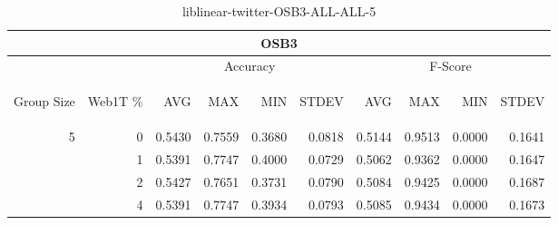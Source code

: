 \begin{center}
\begin{table}[htbp]
\begin{tabular}{ | r | r | r | r | r | r | r | r | r | r |}
\hline
\multicolumn{10}{|c|}{OSB3}\\
\hline
 & & \multicolumn{4}{|c|}{Accuracy} & \multicolumn{4}{|c|}{F-Score}\\ \cline{3-10}
\begin{sideways}Group Size\end{sideways} & \begin{sideways}Web1T \%\end{sideways} & \begin{sideways}AVG\end{sideways} & \begin{sideways}MAX\end{sideways} & \begin{sideways}MIN\end{sideways} & \begin{sideways}STDEV\end{sideways} & \begin{sideways}AVG\end{sideways} & \begin{sideways}MAX\end{sideways} & \begin{sideways}MIN\end{sideways} & \begin{sideways}STDEV\end{sideways}\\
\hline
\multirow{3}{*}{5}
 & 0 & 0.5430 & 0.7559 & 0.3680 & 0.0818 & 0.5144 & 0.9513 & 0.0000 & 0.1641\\ \cline{2-10}
 & 1 & 0.5391 & 0.7747 & 0.4000 & 0.0729 & 0.5062 & 0.9362 & 0.0000 & 0.1647\\ \cline{2-10}
 & 2 & 0.5427 & 0.7651 & 0.3731 & 0.0790 & 0.5084 & 0.9425 & 0.0000 & 0.1687\\ \cline{2-10}
 & 4 & 0.5391 & 0.7747 & 0.3934 & 0.0793 & 0.5085 & 0.9434 & 0.0000 & 0.1673\\ \cline{2-10}
\hline
\end{tabular}
\caption{liblinear-twitter-OSB3-ALL-ALL-5}
\label{table:liblinear-twitter-OSB3-ALL-ALL-5}
\end{table}
\end{center}

